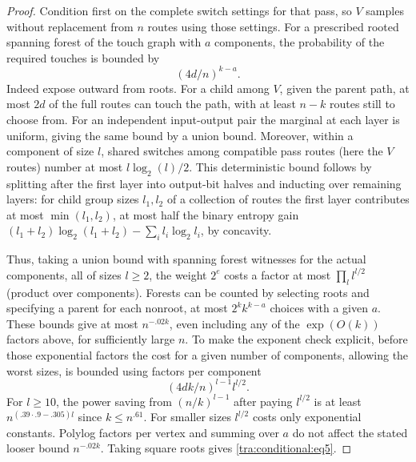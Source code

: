 \begin{proof}
Condition first on the complete switch settings for that pass, so \(V\) samples without replacement from \(n\) routes using those settings. For a prescribed rooted spanning forest of the touch graph with \(a\) components, the probability of the required touches is bounded by
\[
                              (4d/n)^{k-a}.
\]
Indeed expose outward from roots. For a child among \(V\), given the parent path, at most \(2d\) of the full routes can touch the path, with at least \(n-k\) routes still to choose from. For an independent input-output pair the marginal at each layer is uniform, giving the same bound by a union bound. Moreover, within a component of size \(l\), shared switches among compatible pass routes (here the \(V\) routes) number at most \(l\log_2(l)/2\). This deterministic bound follows by splitting after the first layer into output-bit halves and inducting over remaining layers: for child group sizes \(l_1,l_2\) of a collection of routes the first layer contributes at most \(\min(l_1,l_2)\), at most half the binary entropy gain
\((l_1+l_2)\log_2(l_1+l_2)-\sum_i l_i\log_2 l_i\), by concavity.

Thus, taking a union bound with spanning forest witnesses for the actual components, all of sizes \(l\ge2\), the weight \(2^e\) costs a factor at most \(\prod_l l^{l/2}\) (product over components). Forests can be counted by selecting roots and specifying a parent for each nonroot, at most \(2^k k^{k-a}\) choices with a given \(a\). These bounds give at most \(n^{-.02 k}\), even including any of the \(\exp(O(k))\) factors above, for sufficiently large \(n\). To make the exponent check explicit, before those exponential factors the cost for a given number of components, allowing the worst sizes, is bounded using factors per component
\[
                          (4d k/n)^{l-1} l^{l/2}.
\]
For \(l\ge10\), the power saving from \((n/k)^{l-1}\) after paying \(l^{l/2}\) is at least \(n^{(.39\cdot .9-.305)l}\) since \(k\le n^{.61}\). For smaller sizes \(l^{l/2}\) costs only exponential constants. Polylog factors per vertex and summing over \(a\) do not affect the stated looser bound \(n^{-.02 k}\). Taking square roots gives \eqref{tra:conditional:eq5}.
\end{proof}
